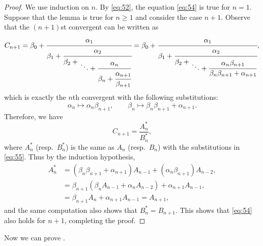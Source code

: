 \documentclass[oneside]{book}
\numberwithin{equation}{section}
\theoremstyle{definition}
\begin{document}
\begin{proof}
  We use induction on \( n \). By \eqref{eq:52}, the equation
  \eqref{eq:54} is true for \( n=1 \). Suppose that the lemma is true
  for \( n\ge1 \) and consider the case \( n+1 \). Observe that
  the \( (n+1) \)st convergent can be written as
  \[
   C_{n+1} = \beta_0+\cfrac{\alpha_1}{
      \beta_1 + \cfrac{\alpha_2}{
        \beta_2 \displaystyle+ \genfrac{}{}{0pt}{0}{}{\ddots +
          \cfrac{\alpha_{n}}{\beta_{n} + \cfrac{\alpha_{n+1}}{\beta_{n+1}}}}}}
    =\beta_0+\cfrac{\alpha_1}{
      \beta_1 + \cfrac{\alpha_2}{
        \beta_2 \displaystyle+ \genfrac{}{}{0pt}{0}{}{\ddots +
          \cfrac{\alpha_{n}\beta_{n+1}}{\beta_{n}\beta_{n+1} + \alpha_{n+1}}}}},
  \]
  which is exactly the \( n \)th convergent with the following
  substitutions:
  \begin{equation}\label{eq:55}
    \alpha_{n} \mapsto \alpha_{n}\beta_{n+1}, \qquad \beta_n \mapsto
    \beta_{n}\beta_{n+1} + \alpha_{n+1}.
  \end{equation}
  Therefore, we have
  \[
    C_{n+1} = \frac{A^*_n}{B^*_n},
  \]
  where \( A^*_n \) (resp.~\( B^*_n \)) is the same as \( A_n \)
  (resp.~\( B_n \)) with the substitutions in \eqref{eq:55}. Thus by
  the induction hypothesis,
  \begin{align*}
    A^*_n &= (\beta_{n}\beta_{n+1} + \alpha_{n+1}) A_{n-1} + (\alpha_{n}\beta_{n+1}) A_{n-2},\\
          &= \beta_{n+1}(\beta_n A_{n-1} + \alpha_n A_{n-2}) + \alpha_{n+1} A_{n-1},\\
          &= \beta_{n+1}A_{n} + \alpha_{n+1} A_{n-1} = A_{n+1},
  \end{align*}
  and the same computation also shows that \( B^*_n = B_{n+1} \). This
  shows that \eqref{eq:54} also holds for \( n+1 \), completing the proof.
\end{proof}

Now we can prove .
\end{document}
